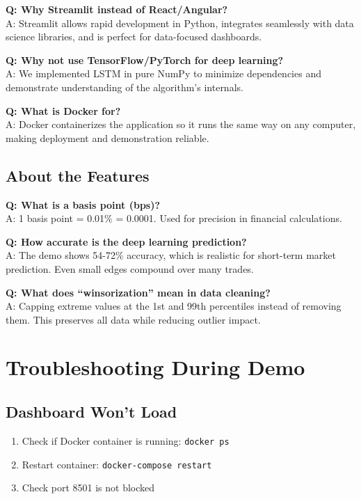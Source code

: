 \documentclass[12pt,a4paper]{article}
\begin{document}
\textbf{Q: Why Streamlit instead of React/Angular?}\\
A: Streamlit allows rapid development in Python, integrates seamlessly with data science libraries, and is perfect for data-focused dashboards.

\textbf{Q: Why not use TensorFlow/PyTorch for deep learning?}\\
A: We implemented LSTM in pure NumPy to minimize dependencies and demonstrate understanding of the algorithm's internals.

\textbf{Q: What is Docker for?}\\
A: Docker containerizes the application so it runs the same way on any computer, making deployment and demonstration reliable.

\subsection{About the Features}

\textbf{Q: What is a basis point (bps)?}\\
A: 1 basis point = 0.01\% = 0.0001. Used for precision in financial calculations.

\textbf{Q: How accurate is the deep learning prediction?}\\
A: The demo shows 54-72\% accuracy, which is realistic for short-term market prediction. Even small edges compound over many trades.

\textbf{Q: What does ``winsorization'' mean in data cleaning?}\\
A: Capping extreme values at the 1st and 99th percentiles instead of removing them. This preserves all data while reducing outlier impact.

\section{Troubleshooting During Demo}

\subsection{Dashboard Won't Load}
\begin{enumerate}
    \item Check if Docker container is running: \texttt{docker ps}
    \item Restart container: \texttt{docker-compose restart}
    \item Check port 8501 is not blocked
\end{enumerate}
\end{document}
